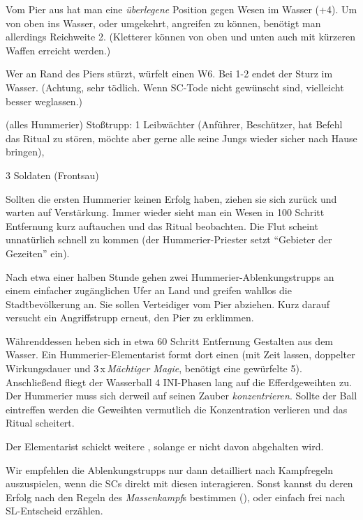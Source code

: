 Vom Pier aus hat man eine \textit{überlegene} Position gegen Wesen im Wasser  (+4). Um von oben ins Wasser, oder umgekehrt, angreifen zu können, benötigt man allerdings Reichweite 2. (Kletterer können von oben und unten auch mit kürzeren Waffen erreicht werden.)

Wer an Rand des Piers stürzt, würfelt einen W6. Bei 1-2 endet der Sturz im Wasser. (Achtung, sehr tödlich. Wenn SC-Tode nicht gewünscht sind, vielleicht besser weglassen.)

 (alles Hummerier) \newline
Stoßtrupp: 1 Leibwächter (Anführer, Beschützer, hat Befehl das Ritual zu stören, möchte aber gerne alle seine Jungs wieder sicher nach Hause bringen),

3 Soldaten (Frontsau)

Sollten die ersten Hummerier keinen Erfolg haben, ziehen sie sich zurück und warten auf Verstärkung. Immer wieder sieht man ein Wesen in 100 Schritt Entfernung  kurz auftauchen und das Ritual beobachten. Die Flut scheint unnatürlich schnell zu kommen (der Hummerier-Priester setzt \enquote{Gebieter der Gezeiten} ein).

Nach etwa einer halben Stunde gehen zwei Hummerier-Ablenkungstrupps an einem einfacher zugänglichen Ufer an Land und greifen wahllos die Stadtbevölkerung an. Sie sollen Verteidiger vom Pier abziehen. Kurz darauf versucht ein Angriffstrupp erneut, den Pier zu erklimmen. 

Währenddessen heben sich in etwa 60 Schritt Entfernung Gestalten aus dem Wasser. Ein Hummerier-Elementarist formt dort einen  (mit Zeit lassen, doppelter Wirkungsdauer und 3\,x\,\textit{Mächtiger Magie}, benötigt eine gewürfelte 5). Anschließend fliegt der Wasserball 4 INI-Phasen lang auf die Efferdgeweihten zu.
Der Hummerier muss sich derweil auf seinen Zauber \textit{konzentrieren}.
Sollte der Ball eintreffen werden die Geweihten vermutlich die Konzentration verlieren und das Ritual scheitert.

Der Elementarist schickt weitere , solange er nicht davon abgehalten wird.

\smallskip

Wir empfehlen die Ablenkungstrupps nur dann detailliert nach Kampfregeln auszuspielen, wenn die SCs direkt mit diesen interagieren.
Sonst kannst du deren Erfolg nach den Regeln des \textit{Massenkampf}s bestimmen (), oder einfach frei nach SL-Entscheid erzählen.


